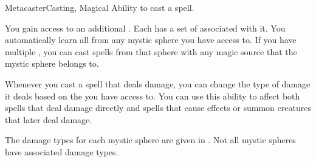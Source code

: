     \begin{feat}{Metacaster}{Casting, Magical}
        \featpre Ability to cast a spell.

         You gain access to an additional .
        Each  has a set of  associated with it.
        You automatically learn all  from any mystic sphere you have access to.
        If you have multiple , you can cast spells from that sphere with any magic source that the mystic sphere belongs to.

         Whenever you cast a spell that deals damage, you can change the type of damage it deals based on the  you have access to.
        You can use this ability to affect both spells that deal damage directly and spells that cause effects or summon creatures that later deal damage.

        The damage types for each mystic sphere are given in .
        Not all mystic spheres have associated damage types.


\end{feat}

